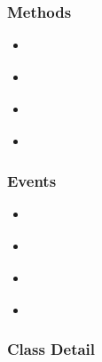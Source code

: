 \documentclass[letterpaper,10pt,english]{sphinxmanual}
\begin{document}
\subsubsection{Methods}
\label{api/component/calendar/index:methods}\begin{itemize}
\item {}
{\hyperref[api/component/calendar/index:Calendar.toggle]{}}

\item {}
{\hyperref[api/component/calendar/index:Calendar.render]{}}

\item {}
{\hyperref[api/component/calendar/index:Calendar.hide]{}}

\item {}
{\hyperref[api/component/calendar/index:Calendar.show]{}}

\end{itemize}


\subsubsection{Events}
\label{api/component/calendar/index:events}\begin{itemize}
\item {}
{\hyperref[api/component/calendar/index:Calendar.select]{}}

\item {}
{\hyperref[api/component/calendar/index:Calendar.monthChange]{}}

\item {}
{\hyperref[api/component/calendar/index:Calendar.rangeSelect]{}}

\item {}
{\hyperref[api/component/calendar/index:Calendar.timeSelect]{}}

\end{itemize}


\subsubsection{Class Detail}
\label{api/component/calendar/index:class-detail}
\end{document}
